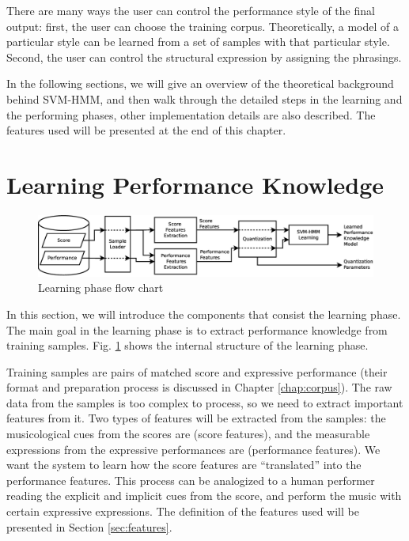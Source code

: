 There are many ways the user can control the performance style of the final output: first, the user can choose the training corpus. Theoretically, a model of a particular style can be learned from a set of samples with that particular style. Second, the user can control the structural expression by assigning the phrasings.


In the following sections, we will give an overview of the theoretical background behind SVM-HMM, and then walk through the detailed steps in the learning and the performing phases, other implementation details are also described. The features used will be presented at the end of this chapter.



\section{Learning Performance Knowledge}
\label{sec:learn}
\begin{figure}[tp]
   \begin{center}
      \includegraphics[width=\textwidth]{fig/learn_arch}
   \end{center}
   \caption{Learning phase flow chart} 
   \label{fig:learnflow}
\end{figure}
In this section, we will introduce the components that consist the learning phase.
The main goal in the learning phase is to extract performance knowledge from training samples. Fig. \ref{fig:learnflow} shows the internal structure of the learning phase.

Training samples are pairs of matched score and expressive performance (their format and preparation process is discussed in Chapter \ref{chap:corpus}). The raw data from the samples is too complex to process, so we need to extract important features from it. Two types of features will be extracted from the samples: the musicological cues from the scores are (score features), and the measurable expressions from the expressive performances are (performance features). We want the system to learn how the score features are \enquote{translated} into the performance features. This process can be analogized to a human performer reading the explicit and implicit cues from the score, and perform the music with certain expressive expressions. The definition of the features used will be presented in Section \ref{sec:features}.


